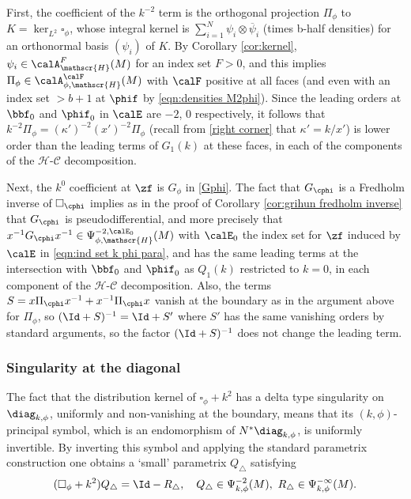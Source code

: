 First,
the coefficient of the $k^{-2}$ term is the orthogonal projection $\Pi_\phi$ to $K=\ker_{L^2}\square_\phi$, whose integral kernel is $\sum_{i=1}^N \psi_i \otimes\overline\psi_i$ (times b-half densities) for an orthonormal basis $(\psi_i)$ of $K$. By Corollary \ref{cor:kernel}, $\psi_i\in \calA^F_{\mathscr{H}}(M)$ for an index set $F>0$, and this implies
$\Pi_\phi\in\calA^\calF_{\phi,\mathscr{H}}(M)$ with $\calF$ positive at all faces (and even with an index set $>b+1$ at $\phif$ by \eqref{eqn:densities M2phi}). Since the leading orders at $\bbf_0$ and $\phif_0$ in $\calE$ are $-2$, $0$ respectively, it follows that $k^{-2}\Pi_\phi=(\kappa')^{-2}(x')^{-2}\Pi_\phi$ (recall from \eqref{right corner} that $\kappa'= k/x'$) is lower order than the leading terms of $G_1(k)$ at these faces, in each of the components of the $\mathscr{H}$-$\mathscr{C}$ decomposition.

Next, the $k^0$ coefficient at $\zf$ is $G_\phi$ in \eqref{Gphi}. The fact that $G_{\cphi}$ is a Fredholm inverse of $\square_{\cphi}$ implies as in the proof of Corollary \ref{cor:grihun fredholm inverse} that $G_{\cphi}$ is pseudodifferential, and more precisely that $x^{-1}G_{\cphi}x^{-1}\in \Psi^{-2,\calE_0}_{\phi, \mathscr{H}}(M)$ with $\calE_0$ the index set for $\zf$ induced by $\calE$ in \eqref{eqn:ind set k phi para}, and has the same leading terms at the intersection with $\bbf_0$ and $\phif_0$ as $Q_1(k)$ restricted to $k=0$, in each component of the $\mathscr{H}$-$\mathscr{C}$ decomposition.
Also, the terms $S=x \Pi_{\cphi} x^{-1} + x^{-1} \Pi_{\cphi} x$ vanish at the boundary as in the argument above for $\Pi_\phi$, so $(\Id+S)^{-1}=\Id+S'$ where $S'$ has the same vanishing orders by standard arguments, so the factor $(\Id+S)^{-1}$ does not change the leading term.

\subsubsection{Singularity at the diagonal}
The fact that the distribution kernel of $\square_\phi+k^2$ has a delta type singularity on $\diag_{k,\phi}$, uniformly and non-vanishing at the boundary, means that its $(k,\phi)$-principal symbol, which is an endomorphism of $N^*\diag_{k,\phi}$, is uniformly invertible. By inverting this symbol and applying the standard parametrix construction one obtains a `small' parametrix $Q_\triangle$ satisfying
\[
(\square_\phi+k^2)Q_\triangle = \Id - R_\triangle,\quad
Q_{\triangle}\in \Psi_{k,\phi}^{-2}(M),\
R_{\triangle}\in \Psi_{k,\phi}^{-\infty}(M).
\]

